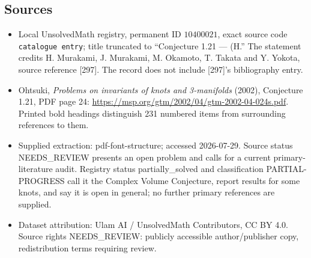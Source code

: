 \documentclass[11pt]{article}
\begin{document}
\subsection{Sources}
\begin{itemize}
\item Local UnsolvedMath registry, permanent ID \(10400021\), exact source code \texttt{catalogue entry}; title truncated to ``Conjecture 1.21 --- (H.'' The statement credits H. Murakami, J. Murakami, M. Okamoto, T. Takata and Y. Yokota, source reference [297]. The record does not include [297]'s bibliography entry.
\item Ohtsuki, \emph{Problems on invariants of knots and 3-manifolds} (2002), Conjecture 1.21, PDF page 24: \url{https://msp.org/gtm/2002/04/gtm-2002-04-024s.pdf}. Printed bold headings distinguish 231 numbered items from surrounding references to them.
\item Supplied extraction: pdf-font-structure; accessed 2026-07-29. Source status NEEDS\_REVIEW presents an open problem and calls for a current primary-literature audit. Registry status partially\_solved and classification PARTIAL-PROGRESS call it the Complex Volume Conjecture, report results for some knots, and say it is open in general; no further primary references are supplied.
\item Dataset attribution: Ulam AI / UnsolvedMath Contributors, CC BY 4.0. Source rights NEEDS\_REVIEW: publicly accessible author/publisher copy, redistribution terms requiring review.
\end{itemize}
\end{document}
